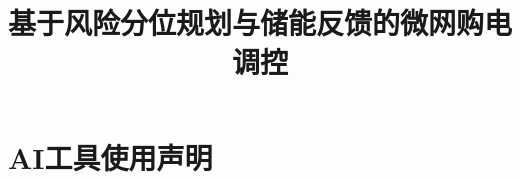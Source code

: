 \documentclass[withoutpreface,bwprint]{cumcmthesis}
\title{基于风险分位规划与储能反馈的微网购电调控}
\begin{document}
\maketitle
\begin{abstract}

\end{abstract}


\FloatBarrier

\section*{AI工具使用声明}

\par
\begingroup
{}


\endgroup
\clearpage
\begin{appendices}
\renewcommand{\thesubsection}{\thesection\thinspace.\thinspace\arabic{subsection}}

\end{appendices}
\end{document}
